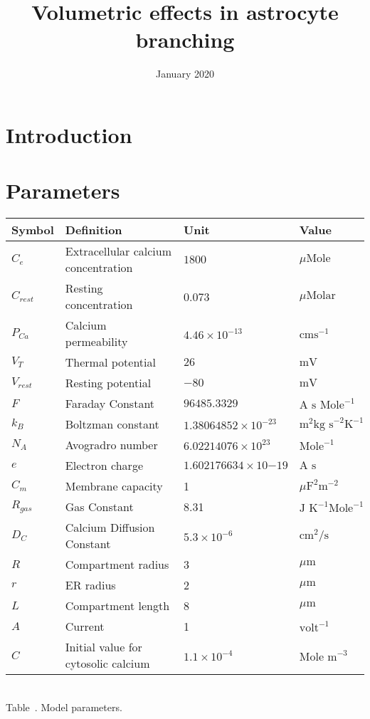 \documentclass{article}
\title{Volumetric effects in astrocyte branching}
\author{ }
\date{January 2020}
\begin{document}
\maketitle
\newcommand{\trm}{\textrm}

\section{Introduction}

\section{Parameters}
\begin{center}
\begin{tabular}{|l|l|l|l|} 
\hline
Symbol & Definition & Unit & Value \\
\hline
$C_e$ & Extracellular calcium concentration & $1800$ & ${\mu\trm{Mole}}$ \\
$C_{rest}$ & Resting concentration & 0.073 & $\mu\trm{Molar}$ \\
$P_{Ca}$ & Calcium permeability & $4.46\times 10^{-13}$ & $\trm{cm} \trm{s}^{-1}$  \\
$V_T$ & Thermal potential& $26$& $\trm{mV}$ \\
$V_{rest}$& Resting potential & $-80$ & $\trm{mV}$ \\
$F$ & Faraday Constant &$96485.3329$ &$\trm{A s Mole}^{-1}$   \\
$k_B$ & Boltzman constant&$1.38064852\times 10^{-23}$ & $\trm{m}^2 \trm{kg s}^{-2} \trm{K}^{-1}$ \\
$N_A$ & Avogradro number& $6.02214076 \times 10^{23}$& $\trm{Mole}^{-1}$ \\
$e$ & Electron charge& $1.602176634\times 10{-19}$& $\trm{A s}$ \\
$C_m$ & Membrane capacity& 1 &$\mu\trm{F}^2 \trm{m}^{-2}$  \\
$R_{gas}$ & Gas Constant& 8.31 & $\trm{J K}^{-1} \trm{Mole}^{-1}$\\
$D_C$ & Calcium Diffusion Constant& $5.3 \times 10^{-6}$ & $\trm{cm}^2/\trm{s}$ \\   %
$R$ & Compartment radius & 3 & $\mu\trm{m}$  \\
$r$ & ER radius & 2 & $\mu\trm{m}$  \\
$L$ & Compartment length& 8 & $\mu\trm{m}$  \\
$A$ & Current& 1 & $\trm{volt}^{-1}$ \\
$C$ & Initial value for cytosolic calcium & $1.1\times 10^{-4}$ & $\trm{Mole m}^{-3}$  \\
\hline
\end{tabular} \\
Table~\cite{tab_params}. Model parameters.


\end{center}
\end{document}
